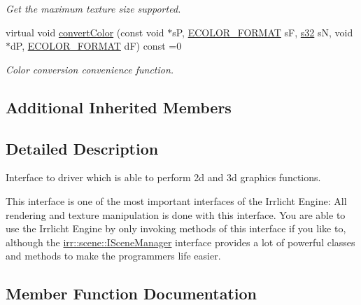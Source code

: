 \begin{DoxyCompactItemize}
\begin{DoxyCompactList}\small\item\em Get the maximum texture size supported. \end{DoxyCompactList}\item 
virtual void \hyperlink{classirr_1_1video_1_1IVideoDriver_afb541967dbb2def61997f1d69f68d5d1}{convert\+Color} (const void $\ast$sP, \hyperlink{namespaceirr_1_1video_a1d5e487888c32b1674a8f75116d829ed}{E\+C\+O\+L\+O\+R\+\_\+\+F\+O\+R\+M\+AT} sF, \hyperlink{namespaceirr_ac66849b7a6ed16e30ebede579f9b47c6}{s32} sN, void $\ast$dP, \hyperlink{namespaceirr_1_1video_a1d5e487888c32b1674a8f75116d829ed}{E\+C\+O\+L\+O\+R\+\_\+\+F\+O\+R\+M\+AT} dF) const =0
\begin{DoxyCompactList}\small\item\em Color conversion convenience function. \end{DoxyCompactList}\end{DoxyCompactItemize}
\subsection*{Additional Inherited Members}


\subsection{Detailed Description}
Interface to driver which is able to perform 2d and 3d graphics functions. 

This interface is one of the most important interfaces of the Irrlicht Engine\+: All rendering and texture manipulation is done with this interface. You are able to use the Irrlicht Engine by only invoking methods of this interface if you like to, although the \hyperlink{classirr_1_1scene_1_1ISceneManager}{irr\+::scene\+::\+I\+Scene\+Manager} interface provides a lot of powerful classes and methods to make the programmer\textquotesingle{}s life easier. 

\subsection{Member Function Documentation}
\mbox{\label{classirr_1_1video_1_1IVideoDriver_a813a39352eae26c4d30b5882618639be}} 
